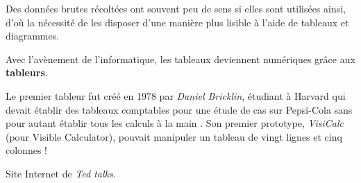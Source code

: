 \vspace*{-9mm}
\begin{changemargin}{-10mm}{-10mm}

\vspace*{-4mm}

\end{changemargin}
\vspace*{-13mm}
\begin{debat}   
   \begin{changemargin}{-15mm}{-15mm}
   Des données brutes récoltées ont souvent peu de sens si elles sont utilisées ainsi, d'où la nécessité
   de les disposer d'une manière plus lisible à l'aide de tableaux et diagrammes.

   Avec l'avènement de l'informatique, les tableaux deviennent numériques grâce aux {\bf tableurs}.
   
   Le premier tableur fut créé en 1978 par {\it Daniel Bricklin}, étudiant à Harvard qui devait établir des tableaux
   comptables pour une étude de cas sur Pepsi-Cola sans pour autant établir tous les calculs \og à la main \fg. 
   Son premier prototype, {\it VisiCalc} (pour Visible Calculator), pouvait manipuler un tableau de vingt
   lignes et cinq colonnes !   
   \begin{center}    
      \scalebox{0.7}{   
      \begin{Tableur}[Bandeau=false,Colonnes=5]
         & & & & \\
         & & & & \\
         & & & & \\
      \end{Tableur}
      }
   \end{center}
   \begin{cadre}[B2][J4]
      \begin{center}
         
         Site Internet de {\it Ted talks}.
      \end{center}
   \end{cadre}
   \end{changemargin}
\end{debat}